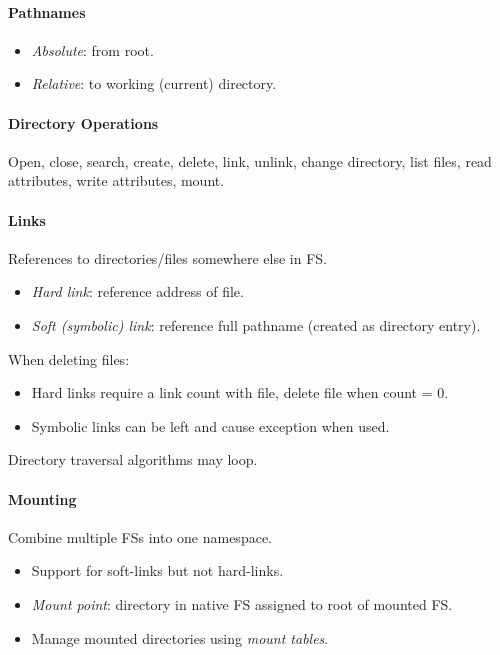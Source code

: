 \documentclass[twocolumn,english]{article}
\begin{document}
\paragraph{Pathnames}
\begin{itemize}
\item \emph{Absolute}: from root.
\item \emph{Relative}: to working (current) directory.
\end{itemize}

\paragraph{Directory Operations}

Open, close, search, create, delete, link, unlink, change directory,
list files, read attributes, write attributes, mount.

\paragraph{Links}

References to directories/files somewhere else in FS.
\begin{itemize}
\item \emph{Hard link}: reference address of file.
\item \emph{Soft (symbolic) link}: reference full pathname (created as directory
entry).
\end{itemize}
When deleting files:
\begin{itemize}
\item Hard links require a link count with file, delete file when count
= 0.
\item Symbolic links can be left and cause exception when used.
\end{itemize}
Directory traversal algorithms may loop.

\paragraph{Mounting}

Combine multiple FSs into one namespace.
\begin{itemize}
\item Support for soft-links but not hard-links.
\item \emph{Mount point}: directory in native FS assigned to root of mounted
FS.
\item Manage mounted directories using \emph{mount tables}.
\end{itemize}
\end{document}
